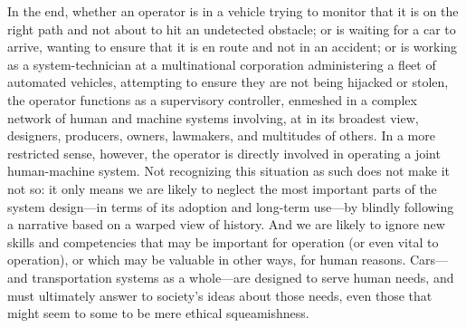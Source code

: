 In the end, whether an operator is in a vehicle trying to monitor that it
is on the right path and not about to hit an undetected
obstacle; or is waiting
for a car to arrive, wanting to ensure that it is en route
and not in an accident; or is working as a system-technician at a
multinational corporation administering a fleet of automated vehicles,
attempting to ensure they are not being 
hijacked or stolen, the operator functions as a supervisory
controller, enmeshed in a complex network of human and machine
systems involving, at in its broadest view, designers, producers,
owners, lawmakers, and multitudes of others. In a more restricted
sense, however, the operator is directly involved in
operating a joint 
human-machine system. Not recognizing this situation as
such does not make it not so:  it  
only means we are 
likely to neglect the most important parts of the system design---in
terms of its adoption and long-term use---by blindly following a
narrative based on a warped view of history. And we are likely to
ignore new skills and competencies that may be important for
operation (or even vital to operation), or which may be valuable in other ways, for
human reasons. Cars---and transportation systems as a whole---are
designed to serve human needs, and must ultimately answer to society's
ideas about those
needs, even those that might seem to some to be mere ethical squeamishness.






